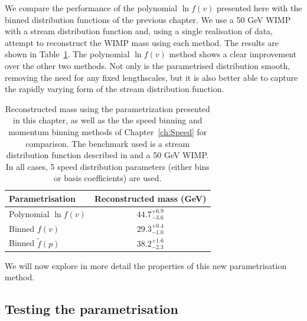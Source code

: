 We compare the performance of the polynomial $\ln f(v)$ presented here with the binned distribution functions of the previous chapter. We use a 50 GeV WIMP with a stream distribution function  and, using a single realisation of data, attempt to reconstruct the WIMP mass using each method. The results are shown in Table~\ref{tab:Poly:ReconstructedMass}. The polynomial $\ln f(v)$ method shows a clear improvement over the other two methods. Not only is the parametrised distribution smooth, removing the need for any fixed lengthscales, but it is also better able to capture the rapidly varying form of the stream distribution function. 

\begin{table}[t]
  \setlength{\extrarowheight}{5pt}
  \begin{center}
	\begin{tabular}{lc}
         \hline\hline
	 Parametrisation & Reconstructed mass (GeV) \\
	 \hline
	 Polynomial $\ln f(v)$ & \(44.7^{+6.9}_{-3.6}\) \\
	 Binned $f(v)$ & \(29.3^{+0.4}_{-1.0}\) \\
	 Binned $\tilde{f}(p)$ & \(38.2^{+1.6}_{-2.3}\)\\
         \hline\hline
	\end{tabular}
  \end{center}
  \caption[Reconstructed mass for a 50 GeV WIMP using the speed binning, momentum binning and polynomial $\ln f(v)$ parametrisations]{Reconstructed mass using the parametrization presented in this chapter, as well as the the speed binning and momentum binning methods of Chapter~\ref{ch:Speed} for comparison. The benchmark used is a stream distribution function described in  and a 50 GeV WIMP. In all cases, 5 speed distribution parameters (either bins or basis coefficients) are used.}
\label{tab:Poly:ReconstructedMass}
\end{table}

We will now explore in more detail the properties of this new parametrisation method.

\subsection{Testing the parametrisation}
\label{sec:Poly:test}

